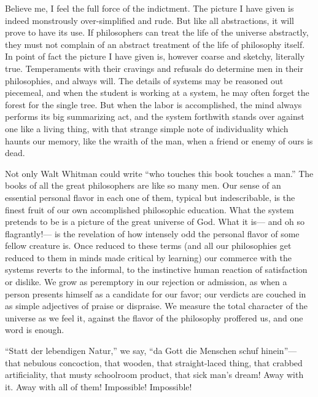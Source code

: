 \documentclass[]{article}
\begin{document}
Believe me, I feel the full force of the indictment. The picture I
have given is indeed monstrously over-simplified and rude. But like all
abstractions, it will prove to have its use. If philosophers can treat
the life of the universe abstractly, they must not complain of an
abstract treatment of the life of philosophy itself. In point of fact
the picture I have given is, however coarse and sketchy, literally true.
Temperaments with their cravings and refusals do determine men in their
philosophies, and always will. The details of systems may be reasoned
out piecemeal, and when the student is working at a system, he may
often forget the forest for the single tree. But when the labor is
accomplished, the mind always performs its big summarizing act, and the
system forthwith stands over against one like a living thing, with that
strange simple note of individuality which haunts our memory, like the
wraith of the man, when a friend or enemy of ours is dead.

Not only Walt Whitman could write ``who touches this book touches a man.''
The books of all the great philosophers are like so many men. Our
sense of an essential personal flavor in each one of them, typical but
indescribable, is the finest fruit of our own accomplished philosophic
education. What the system pretends to be is a picture of the great
universe of God. What it is--- and oh so flagrantly!--- is the revelation of
how intensely odd the personal flavor of some fellow creature is. Once
reduced to these terms (and all our philosophies get reduced to them in
minds made critical by learning) our commerce with the systems reverts
to the informal, to the instinctive human reaction of satisfaction or
dislike. We grow as peremptory in our rejection or admission, as when a
person presents himself as a candidate for our favor; our verdicts are
couched in as simple adjectives of praise or dispraise. We measure the
total character of the universe as we feel it, against the flavor of the
philosophy proffered us, and one word is enough.

``Statt der lebendigen Natur,'' we say, ``da Gott die Menschen schuf
hinein''--- that nebulous concoction, that wooden, that straight-laced
thing, that crabbed artificiality, that musty schoolroom product, that
sick man's dream! Away with it. Away with all of them! Impossible!
Impossible!
\end{document}
